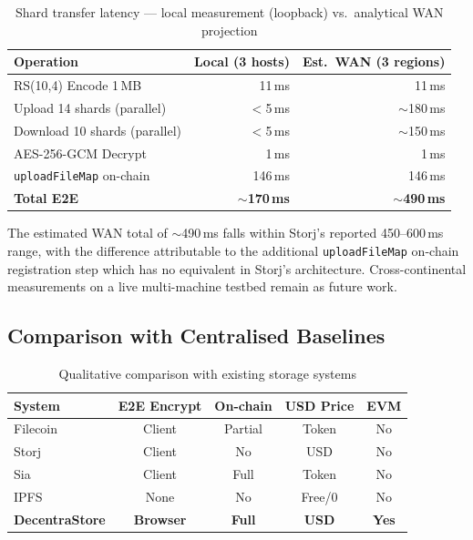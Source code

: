 \documentclass[journal]{IEEEtran}
\newcommand{\AESDecryptMs}{1\,ms}
\newcommand{\RSEncodeMs}{11\,ms}
\newcommand{\RSShards}{14}
\newcommand{\RSData}{10}
\newcommand{\RSParity}{4}
\begin{document}
\begin{table}[t]
\caption{Shard transfer latency — local measurement (loopback) vs.\ analytical WAN projection}
\label{tab:network}
\centering
\begin{tabular}{lrr}
\toprule
Operation & Local (3 hosts) & Est.\ WAN (3 regions) \\
\midrule
RS(\RSData{},\RSParity{}) Encode 1\,MB & \RSEncodeMs{} & \RSEncodeMs{} \\
Upload \RSShards{} shards (parallel)   & $<$5\,ms       & $\sim$180\,ms \\
Download 10 shards (parallel)          & $<$5\,ms       & $\sim$150\,ms \\
AES-256-GCM Decrypt                    & \AESDecryptMs{} & \AESDecryptMs{} \\
\texttt{uploadFileMap} on-chain        & 146\,ms         & 146\,ms \\
\midrule
\textbf{Total E2E}                     & \textbf{$\sim$170\,ms} & \textbf{$\sim$490\,ms} \\
\bottomrule
\end{tabular}
\end{table}

The estimated WAN total of $\sim$490\,ms falls within Storj's
reported 450--600\,ms range, with the difference attributable to
the additional \texttt{uploadFileMap} on-chain registration step
which has no equivalent in Storj's architecture.
%
Cross-continental measurements on a live multi-machine testbed
remain as future work.

\subsection{Comparison with Centralised Baselines}

\begin{table}[t]
\caption{Qualitative comparison with existing storage systems}
\label{tab:compare}
\centering
\begin{tabular}{lcccc}
\toprule
System & E2E Encrypt & On-chain & USD Price & EVM \\
\midrule
Filecoin   & Client & Partial & Token     & No  \\
Storj      & Client & No      & USD       & No  \\
Sia        & Client & Full    & Token     & No  \\
IPFS       & None   & No      & Free/0    & No  \\
\textbf{DecentraStore} & \textbf{Browser} & \textbf{Full} & \textbf{USD} & \textbf{Yes} \\
\bottomrule
\end{tabular}
\end{table}
\end{document}
